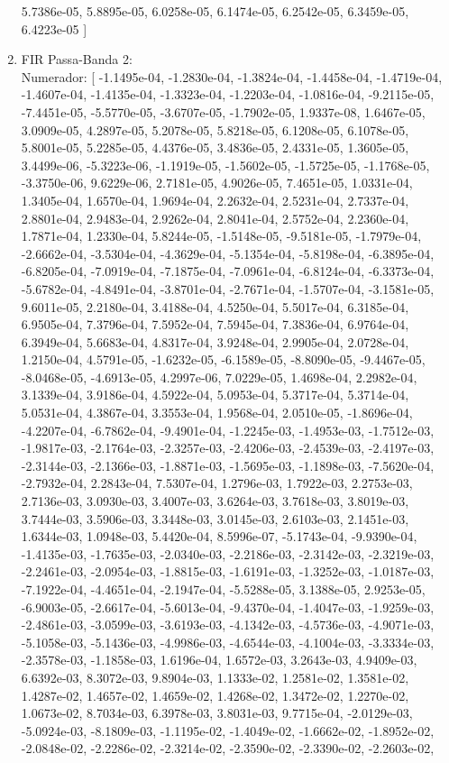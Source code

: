 \documentclass[12pt,fleqn]{article}
\begin{document}
\begin{enumerate}
5.7386e-05,  5.8895e-05,  6.0258e-05,  6.1474e-05,  6.2542e-05,  6.3459e-05,  6.4223e-05 ]
    \item FIR Passa-Banda 2:
    \\ Numerador: [ -1.1495e-04, -1.2830e-04, -1.3824e-04, -1.4458e-04, -1.4719e-04, -1.4607e-04, -1.4135e-04, -1.3323e-04,  -1.2203e-04, -1.0816e-04, -9.2115e-05, -7.4451e-05, -5.5770e-05, -3.6707e-05, -1.7902e-05,  1.9337e-08,  1.6467e-05,  3.0909e-05,  4.2897e-05,  5.2078e-05,  5.8218e-05,  6.1208e-05,  6.1078e-05,  5.8001e-05,  5.2285e-05,  4.4376e-05,  3.4836e-05,  2.4331e-05,  1.3605e-05,  3.4499e-06, -5.3223e-06, -1.1919e-05,  -1.5602e-05, -1.5725e-05, -1.1768e-05, -3.3750e-06,  9.6229e-06,  2.7181e-05,  4.9026e-05,  7.4651e-05,  1.0331e-04,  1.3405e-04,  1.6570e-04,  1.9694e-04,  2.2632e-04,  2.5231e-04,  2.7337e-04,  2.8801e-04,  2.9483e-04,  2.9262e-04,  2.8041e-04,  2.5752e-04,  2.2360e-04,  1.7871e-04,  1.2330e-04,  5.8244e-05,  -1.5148e-05, -9.5181e-05, -1.7979e-04, -2.6662e-04, -3.5304e-04, -4.3629e-04, -5.1354e-04, -5.8198e-04,  -6.3895e-04, -6.8205e-04, -7.0919e-04, -7.1875e-04, -7.0961e-04, -6.8124e-04, -6.3373e-04, -5.6782e-04,  -4.8491e-04, -3.8701e-04, -2.7671e-04, -1.5707e-04, -3.1581e-05,  9.6011e-05,  2.2180e-04,  3.4188e-04,  4.5250e-04,  5.5017e-04,  6.3185e-04,  6.9505e-04,  7.3796e-04,  7.5952e-04,  7.5945e-04,  7.3836e-04,  6.9764e-04,  6.3949e-04,  5.6683e-04,  4.8317e-04,  3.9248e-04,  2.9905e-04,  2.0728e-04,  1.2150e-04,  4.5791e-05, -1.6232e-05, -6.1589e-05, -8.8090e-05, -9.4467e-05, -8.0468e-05, -4.6913e-05,  4.2997e-06,  7.0229e-05,  1.4698e-04,  2.2982e-04,  3.1339e-04,  3.9186e-04,  4.5922e-04,  5.0953e-04,  5.3717e-04,  5.3714e-04,  5.0531e-04,  4.3867e-04,  3.3553e-04,  1.9568e-04,  2.0510e-05, -1.8696e-04, -4.2207e-04,  -6.7862e-04, -9.4901e-04, -1.2245e-03, -1.4953e-03, -1.7512e-03, -1.9817e-03, -2.1764e-03, -2.3257e-03,  -2.4206e-03, -2.4539e-03, -2.4197e-03, -2.3144e-03, -2.1366e-03, -1.8871e-03, -1.5695e-03, -1.1898e-03,  -7.5620e-04, -2.7932e-04,  2.2843e-04,  7.5307e-04,  1.2796e-03,  1.7922e-03,  2.2753e-03,  2.7136e-03,  3.0930e-03,  3.4007e-03,  3.6264e-03,  3.7618e-03,  3.8019e-03,  3.7444e-03,  3.5906e-03,  3.3448e-03,  3.0145e-03,  2.6103e-03,  2.1451e-03,  1.6344e-03,  1.0948e-03,  5.4420e-04,  8.5996e-07, -5.1743e-04,  -9.9390e-04, -1.4135e-03, -1.7635e-03, -2.0340e-03, -2.2186e-03, -2.3142e-03, -2.3219e-03, -2.2461e-03,  -2.0954e-03, -1.8815e-03, -1.6191e-03, -1.3252e-03, -1.0187e-03, -7.1922e-04, -4.4651e-04, -2.1947e-04,  -5.5288e-05,  3.1388e-05,  2.9253e-05, -6.9003e-05, -2.6617e-04, -5.6013e-04, -9.4370e-04, -1.4047e-03,  -1.9259e-03, -2.4861e-03, -3.0599e-03, -3.6193e-03, -4.1342e-03, -4.5736e-03, -4.9071e-03, -5.1058e-03,  -5.1436e-03, -4.9986e-03, -4.6544e-03, -4.1004e-03, -3.3334e-03, -2.3578e-03, -1.1858e-03,  1.6196e-04,  1.6572e-03,  3.2643e-03,  4.9409e-03,  6.6392e-03,  8.3072e-03,  9.8904e-03,  1.1333e-02,  1.2581e-02,  1.3581e-02,  1.4287e-02,  1.4657e-02,  1.4659e-02,  1.4268e-02,  1.3472e-02,  1.2270e-02,  1.0673e-02,  8.7034e-03,  6.3978e-03,  3.8031e-03,  9.7715e-04, -2.0129e-03, -5.0924e-03, -8.1809e-03, -1.1195e-02,  -1.4049e-02, -1.6662e-02, -1.8952e-02, -2.0848e-02, -2.2286e-02, -2.3214e-02, -2.3590e-02, -2.3390e-02,  -2.2603e-02, 
\end{enumerate}
\end{document}

